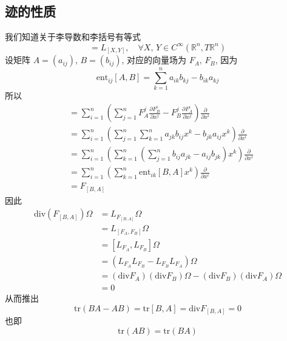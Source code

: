\documentclass{book}
\begin{document}
        \subsection{迹的性质}
        我们知道关于李导数和李括号有等式
        \begin{equation*}
            [L_X, L_Y] = L_{[X,Y]}, \quad\forall X,\,Y\in C^{\infty}(\mathbb{R}^n,T\mathbb{R}^n)
        \end{equation*}
        设矩阵 $A = (a_{ij}),\,B = (b_{ij})$, 对应的向量场为 $F_A,\,F_B$, 因为
        \begin{equation*}
            \mathrm{ent}_{ij}[A,B] = \sum_{k=1}^{n}a_{ik}b_{kj}-b_{ik}a_{kj}
        \end{equation*}
        所以
        \begin{align*}
            [F_A,F_B] &= \sum_{i=1}^{n}\left(\sum_{j=1}^{n}F_A^j\frac{\partial F_B^i}{\partial x^j}-F_B^j\frac{\partial F_A^i}{\partial x^j}\right)\frac{\partial}{\partial x^i} \\
            &= \sum_{i=1}^{n}\left(\sum_{j=1}^{n}\sum_{k=1}^{n}a_{jk}b_{ij}x^k-b_{jk}a_{ij}x^k\right)\frac{\partial}{\partial x^i} \\
            &= \sum_{i=1}^{n}\left(\sum_{k=1}^{n}\left(\sum_{j=1}^{n}b_{ij}a_{jk}-a_{ij}b_{jk}\right)x^k\right)\frac{\partial}{\partial x^i} \\
            &= \sum_{i=1}^{n}\left(\sum_{k=1}^{n}\mathrm{ent}_{ik}[B,A]x^k\right)\frac{\partial}{\partial x^i} \\
            &= F_{[B,A]}
        \end{align*}
        因此
        \begin{align*}
            \mathrm{div}(F_{[B,A]})\Omega &= L_{F_{[B,A]}}\Omega \\
            &= L_{[F_A,F_B]}\Omega \\
            &= [L_{F_A},L_{F_B}]\Omega \\
            &= (L_{F_A}L_{F_B}-L_{F_B}L_{F_A})\Omega \\
            &= (\mathrm{div}F_A)(\mathrm{div}F_B)\Omega - (\mathrm{div}F_B)(\mathrm{div}F_A)\Omega \\
            &= 0
        \end{align*}
        从而推出
        \begin{equation*}
            \mathrm{tr}(BA-AB) = \mathrm{tr}[B,A] = \mathrm{div}F_{[B,A]} = 0
        \end{equation*}
        也即
        \begin{equation*}
            \mathrm{tr}(AB) = \mathrm{tr}(BA)
        \end{equation*}
\end{document}
